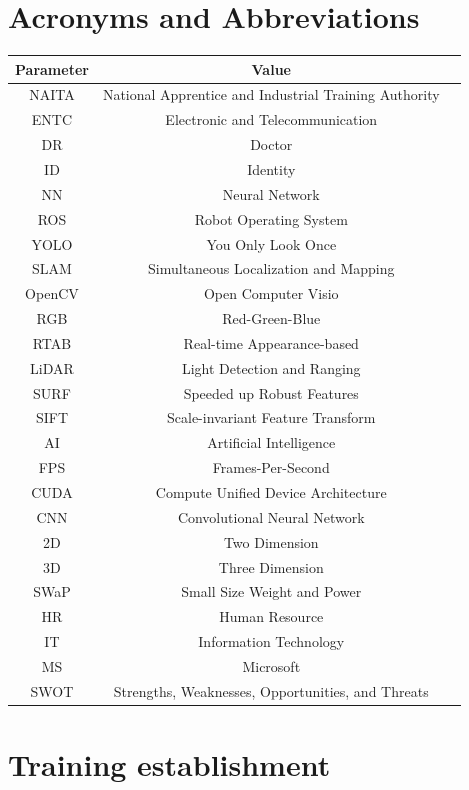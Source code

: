 \documentclass[twoside,12pt,times,onecolumn,a4paper]{report}
\begin{document}
\chapter{Acronyms and Abbreviations}
\begin{center}
\begin{longtable}{ |c|c|c| } 
\hline
Parameter & Value \\
\hline
NAITA &  National Apprentice and Industrial Training Authority \\
ENTC &  Electronic and Telecommunication \\
DR & Doctor\\
ID & Identity\\
NN & Neural Network\\
ROS & Robot Operating System \\ 
YOLO & You Only Look Once\\ 
SLAM &  Simultaneous Localization and Mapping\\
OpenCV & Open Computer Visio\\
RGB &  Red-Green-Blue \\
RTAB & Real-time Appearance-based\\
LiDAR &  Light Detection and Ranging \\
SURF & Speeded up Robust Features\\
SIFT & Scale-invariant Feature Transform\\
AI &  Artificial Intelligence \\
FPS &  Frames-Per-Second \\
CUDA & Compute Unified Device Architecture \\
CNN & Convolutional Neural Network \\
2D & Two Dimension\\
3D & Three Dimension\\
SWaP & Small Size Weight and Power \\
HR & Human Resource\\
IT & Information Technology\\
MS & Microsoft\\
SWOT & Strengths, Weaknesses, Opportunities, and Threats\\

\hline
\end{longtable}
\end{center}

\listoffigures
\listoftables


\chapter{Training establishment}
\end{document}
